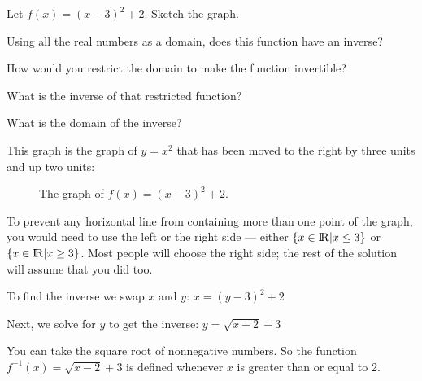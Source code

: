\begin{Exercise}[title={Find the inverse}, label=simple_inverse]

  Let $f(x) = (x - 3)^2 + 2$.  Sketch the graph.

  Using all the real numbers as a domain, does this function have an inverse?

  How would you restrict the domain to make the function invertible?

  What is the inverse of that restricted function?

  What is the domain of the inverse?

\end{Exercise}
\begin{Answer}[ref=simple_inverse]

  This graph is the graph of $y = x^2$ that has been moved to the right by three units and up two units:
  \begin{figure}[H]
    \centering
    \caption{The graph of $f(x) = (x - 3)^2 + 2$.}
    \label{fig:exer_inv}
  \end{figure}


  To prevent any horizontal line from containing more than one point of
  the graph, you would need to use the left or the right side --- either
  $\{x \in {\rm I\!R}  | x \leq 3\}$ or $\{x \in {\rm I\!R}| x \geq 3\}$. Most people will choose the
  right side; the rest of the solution will assume that you did too.

  To find the inverse we swap $x$ and $y$: $x = (y -3)^2 + 2$

  Next, we solve for $y$ to get the inverse: $y = \sqrt{x - 2} + 3$

  You can take the square root of nonnegative numbers. So the function
  $f^{-1}(x) = \sqrt{x - 2} + 3$ is defined whenever $x$ is greater than
  or equal to 2.

\end{Answer}

